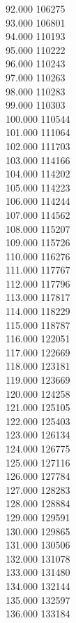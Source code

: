 { 92.000	106275 \\
 93.000	106801 \\
 94.000	110193 \\
 95.000	110222 \\
 96.000	110243 \\
 97.000	110263 \\
 98.000	110283 \\
 99.000	110303 \\
 100.000	110544 \\
 101.000	111064 \\
 102.000	111703 \\
 103.000	114166 \\
 104.000	114202 \\
 105.000	114223 \\
 106.000	114244 \\
 107.000	114562 \\
 108.000	115207 \\
 109.000	115726 \\
 110.000	116276 \\
 111.000	117767 \\
 112.000	117796 \\
 113.000	117817 \\
 114.000	118229 \\
 115.000	118787 \\
 116.000	122051 \\
 117.000	122669 \\
 118.000	123181 \\
 119.000	123669 \\
 120.000	124258 \\
 121.000	125105 \\
 122.000	125403 \\
 123.000	126134 \\
 124.000	126775 \\
 125.000	127116 \\
 126.000	127784 \\
 127.000	128283 \\
 128.000	128884 \\
 129.000	129591 \\
 130.000	129865 \\
 131.000	130506 \\
 132.000	131078 \\
 133.000	131480 \\
 134.000	132144 \\
 135.000	132597 \\
 136.000	133184 \\
}
